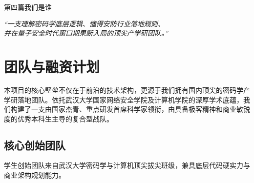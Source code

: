 \cleardoublepage
\thispagestyle{empty}

\vspace*{6cm}

\begin{center}
	{\heiti\erhao 第四篇\quad 我们是谁} 
	
	\vspace{2cm} 
	
	{\songti\xiaosi \textit{“一支理解密码学底层逻辑、懂得安防行业落地规则、\\ [0.5em] 并在量子安全时代窗口期果断入局的顶尖产学研团队。”}}
\end{center}

\vfill
\cleardoublepage

\chapter{团队与融资计划}

本项目的核心壁垒不仅在于前沿的技术架构，更源于我们拥有国内顶尖的密码学产学研落地团队。依托武汉大学国家网络安全学院及计算机学院的深厚学术底蕴，我们构建了一支由国家杰青、重点研发首席科学家领衔，由具备极客精神和商业敏锐度的优秀本科生主导的复合型战队。

\section{核心创始团队}

学生创始团队来自武汉大学密码学与计算机顶尖拔尖班级，兼具底层代码硬实力与商业架构规划能力。

